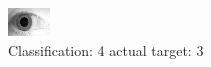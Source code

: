 \begin{figure}[h!]
\begin{center}
\includegraphics[width=0.60\columnwidth]{figures/ID1919_class_4_target_3.png}
\end{center}
\caption{ Classification: 4 actual target: 3}
\label{fig:ID1919_class_4_target_3}
\end{figure}

